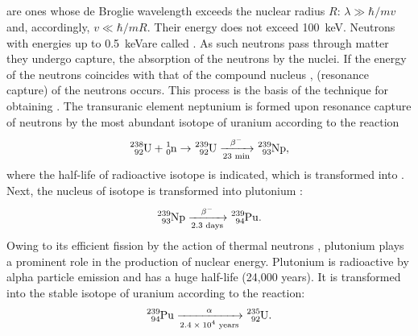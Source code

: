 \subsection{}\label{42.9.8}  are ones whose de Broglie wavelength  exceeds the nuclear radius $R$: $\lambda \gg \hbar/mv$ and, accordingly,
$v \ll \hbar/mR$. Their energy does not exceed \SI{100}{\keV}. Neutrons with energies up to \SI{0.5}{\keV}are called . As such neutrons pass through matter they undergo capture, the absorption of the neutrons by the nuclei. If the energy of the neutrons
coincides with that of the compound nucleus ,  (resonance capture) of the neutrons occurs. This process is the basis of the technique for obtaining . The transuranic element neptunium 
is formed upon resonance capture of neutrons by the most abundant isotope of uranium  according to the reaction
\begin{equation*}
\ce{^{238}_{92}U} + \ce{^{1}_{0}n} \to \ce{^{239}_{92}U} 
\xrightarrow[\text{23 min}]{\beta^{-}}  
\ce{^{239}_{93}Np},
\end{equation*}
where the half-life of radioactive isotope   is indicated, which is transformed into . Next, the nucleus of isotope
 is transformed into plutonium :
\begin{equation*}
\ce{^{239}_{93}Np} 
\xrightarrow[\text{2.3 days}]{\beta^{-}}  
\ce{^{239}_{94}Pu}.
\end{equation*}
Owing to its efficient fission by the action of thermal neutrons , plutonium plays a prominent role in the production of nuclear energy. Plutonium  is radioactive by alpha particle emission and has a huge half-life (24,000 years). It is transformed into the stable isotope of uranium  according to the
reaction:
\begin{equation*}
\ce{^{239}_{94}Pu}
\xrightarrow[\text{\num{2.4d4} years}]{\alpha} \ce{^{235}_{92}U}.
\end{equation*}

